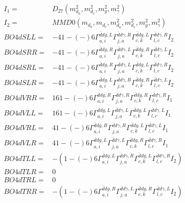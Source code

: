 \documentclass[A4,landscape]{article}
\begin{document}
\begin{align} 
I_1 = & D_{27}(m^2_{d_{{a}}}, m^2_{d_{{c}}}, m^2_{g}, m^2_{\gamma}) \\ 
I_2 = & MMD0(m_{d_{{a}}}, m_{d_{{c}}}, m^2_{d_{{a}}}, m^2_{d_{{c}}}, m^2_{g}, m^2_{\gamma}) \\ 
  BO4dSLL= & -4   1
-(-)
  6 \Gamma^{\bar{d}d g ,L}_{a, i} \Gamma^{\bar{d}d \gamma ,R}_{j, a} \Gamma^{\bar{d}d g ,L}_{c, k} \Gamma^{\bar{d}d \gamma ,R}_{l, c} I_2 \\ 
  BO4dSRR= & -4   1
-(-)
  6 \Gamma^{\bar{d}d g ,R}_{a, i} \Gamma^{\bar{d}d \gamma ,L}_{j, a} \Gamma^{\bar{d}d g ,R}_{c, k} \Gamma^{\bar{d}d \gamma ,L}_{l, c} I_2 \\ 
  BO4dSRL= & -4   1
-(-)
  6 \Gamma^{\bar{d}d g ,R}_{a, i} \Gamma^{\bar{d}d \gamma ,L}_{j, a} \Gamma^{\bar{d}d g ,L}_{c, k} \Gamma^{\bar{d}d \gamma ,R}_{l, c} I_2 \\ 
  BO4dSLR= & -4   1
-(-)
  6 \Gamma^{\bar{d}d g ,L}_{a, i} \Gamma^{\bar{d}d \gamma ,R}_{j, a} \Gamma^{\bar{d}d g ,R}_{c, k} \Gamma^{\bar{d}d \gamma ,L}_{l, c} I_2 \\ 
  BO4dVRR= & 16   1
-(-)
  6 \Gamma^{\bar{d}d g ,R}_{a, i} \Gamma^{\bar{d}d \gamma ,R}_{j, a} \Gamma^{\bar{d}d g ,R}_{c, k} \Gamma^{\bar{d}d \gamma ,R}_{l, c} I_1 \\ 
  BO4dVLL= & 16   1
-(-)
  6 \Gamma^{\bar{d}d g ,L}_{a, i} \Gamma^{\bar{d}d \gamma ,L}_{j, a} \Gamma^{\bar{d}d g ,L}_{c, k} \Gamma^{\bar{d}d \gamma ,L}_{l, c} I_1 \\ 
  BO4dVRL= & 4   1
-(-)
  6 \Gamma^{\bar{d}d g ,R}_{a, i} \Gamma^{\bar{d}d \gamma ,R}_{j, a} \Gamma^{\bar{d}d g ,L}_{c, k} \Gamma^{\bar{d}d \gamma ,L}_{l, c} I_1 \\ 
  BO4dVLR= & 4   1
-(-)
  6 \Gamma^{\bar{d}d g ,L}_{a, i} \Gamma^{\bar{d}d \gamma ,L}_{j, a} \Gamma^{\bar{d}d g ,R}_{c, k} \Gamma^{\bar{d}d \gamma ,R}_{l, c} I_1 \\ 
  BO4dTLL= & -(  1
-(-)
  6 \Gamma^{\bar{d}d g ,L}_{a, i} \Gamma^{\bar{d}d \gamma ,R}_{j, a} \Gamma^{\bar{d}d g ,L}_{c, k} \Gamma^{\bar{d}d \gamma ,R}_{l, c} I_2) \\ 
  BO4dTLR= & 0 \\ 
  BO4dTRL= & 0 \\ 
  BO4dTRR= & -(  1
-(-)
  6 \Gamma^{\bar{d}d g ,R}_{a, i} \Gamma^{\bar{d}d \gamma ,L}_{j, a} \Gamma^{\bar{d}d g ,R}_{c, k} \Gamma^{\bar{d}d \gamma ,L}_{l, c} I_2) \\ 
\end{align} 
\end{document}

